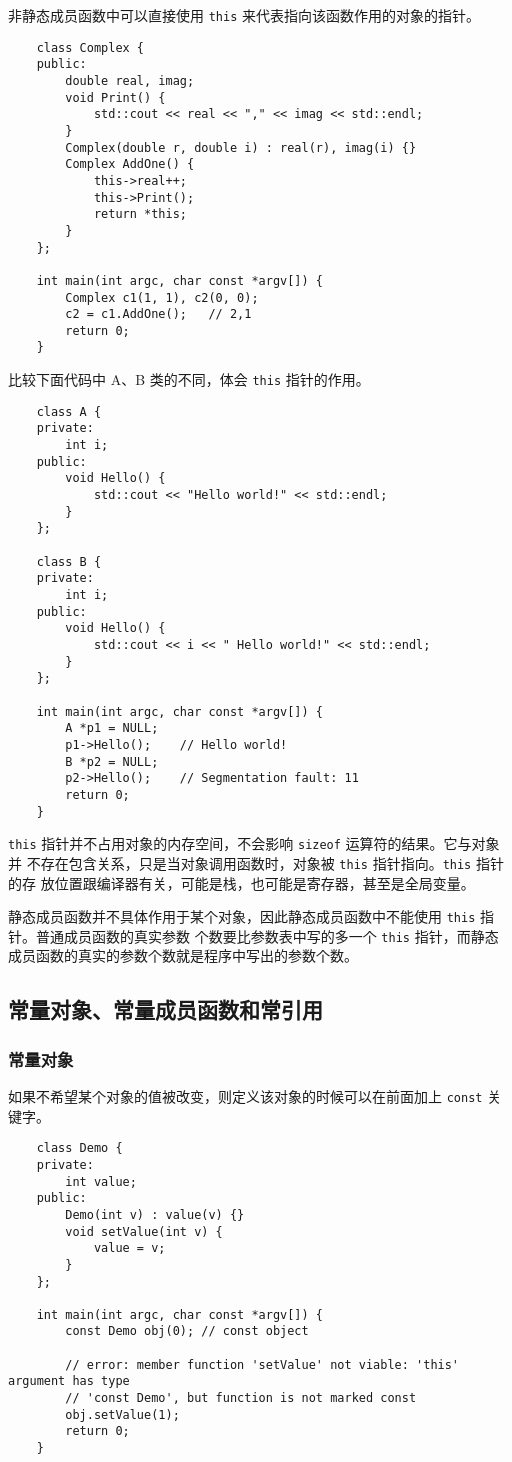 \documentclass[UTF8]{ctexart}
\begin{document}
非静态成员函数中可以直接使用 \texttt{this} 来代表指向该函数作用的对象的指针。
\begin{verbatim}
    class Complex {
    public:
        double real, imag;
        void Print() {
            std::cout << real << "," << imag << std::endl;
        }
        Complex(double r, double i) : real(r), imag(i) {}
        Complex AddOne() {
            this->real++;
            this->Print();
            return *this;
        }
    };

    int main(int argc, char const *argv[]) {
        Complex c1(1, 1), c2(0, 0);
        c2 = c1.AddOne();   // 2,1
        return 0;
    }
\end{verbatim}

比较下面代码中 A、B 类的不同，体会 \texttt{this} 指针的作用。
\begin{verbatim}
    class A {
    private:
        int i;
    public:
        void Hello() {
            std::cout << "Hello world!" << std::endl;
        }
    };

    class B {
    private:
        int i;
    public:
        void Hello() {
            std::cout << i << " Hello world!" << std::endl;
        }
    };

    int main(int argc, char const *argv[]) {
        A *p1 = NULL;
        p1->Hello();    // Hello world!
        B *p2 = NULL;
        p2->Hello();    // Segmentation fault: 11
        return 0;
    }
\end{verbatim}

\texttt{this} 指针并不占用对象的内存空间，不会影响 \texttt{sizeof} 运算符的结果。它与对象并
不存在包含关系，只是当对象调用函数时，对象被 \texttt{this} 指针指向。\texttt{this} 指针的存
放位置跟编译器有关，可能是栈，也可能是寄存器，甚至是全局变量。

静态成员函数并不具体作用于某个对象，因此静态成员函数中不能使用 \texttt{this} 指针。普通成员函数的真实参数
个数要比参数表中写的多一个 \texttt{this} 指针，而静态成员函数的真实的参数个数就是程序中写出的参数个数。

\subsection{常量对象、常量成员函数和常引用}
\subsubsection{常量对象}
如果不希望某个对象的值被改变，则定义该对象的时候可以在前面加上 \texttt{const} 关键字。
\begin{verbatim}
    class Demo {
    private:
        int value;
    public:
        Demo(int v) : value(v) {}
        void setValue(int v) {
            value = v;
        }
    };

    int main(int argc, char const *argv[]) {
        const Demo obj(0); // const object

        // error: member function 'setValue' not viable: 'this' argument has type
        // 'const Demo', but function is not marked const
        obj.setValue(1);
        return 0;
    }
\end{verbatim}
\end{document}
